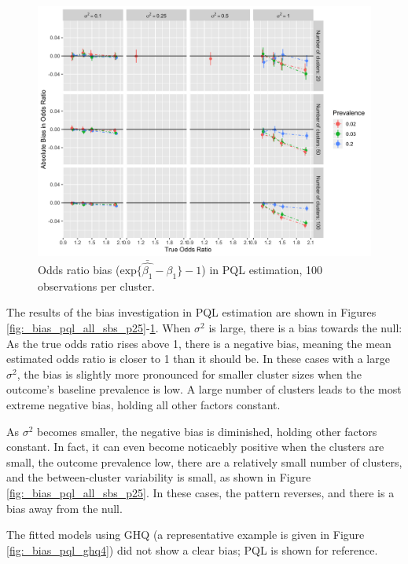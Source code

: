 \documentclass[Afour,times,sagev,doublespace]{sagej}
\begin{document}
\begin{figure}
\centering
\includegraphics[width=\linewidth]{_bias_pql_all_sbsP100_temp.png}
  \caption{Odds ratio bias ($\text{exp} \{ \bar{\hat{\beta_1}} - \beta_1 \} - 1$) in PQL estimation, 100 observations per cluster.}
    \label{fig:_bias_pql_all_sbs_p100}
\end{figure}


The results of the bias investigation in PQL estimation are shown in Figures \ref{fig:_bias_pql_all_sbs_p25}-\ref{fig:_bias_pql_all_sbs_p100}. When $\sigma^2$ is large, there is a bias towards the null: As the true odds ratio rises above 1, there is a negative bias, meaning the mean estimated odds ratio is closer to 1 than it should be. In these cases with a large $\sigma^2$, the bias is slightly more pronounced for smaller cluster sizes when the outcome's baseline prevalence is low. A large number of clusters leads to the most extreme negative bias, holding all other factors constant.

As $\sigma^2$ becomes smaller, the negative bias is diminished, holding other factors constant. In fact, it can even become noticaebly positive when the clusters are small, the outcome prevalence low, there are a relatively small number of clusters, and the between-cluster variability is small, as shown in Figure \ref{fig:_bias_pql_all_sbs_p25}. In these cases, the pattern reverses, and there is a bias away from the null.

The fitted models using GHQ (a representative example is given in Figure \ref{fig:_bias_pql_ghq4}) did not show a clear bias; PQL is shown for reference.
\end{document}
